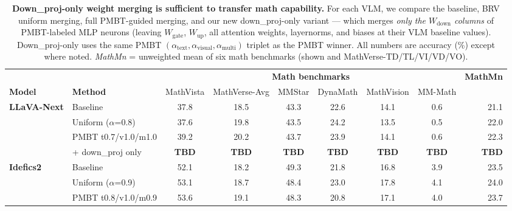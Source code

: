 \begin{table}[t]
\centering
\small
\caption{\textbf{Down\_proj-only weight merging is sufficient to transfer math capability.}
For each VLM, we compare the baseline, BRV uniform merging, full PMBT-guided merging,
and our new down\_proj-only variant — which merges \emph{only the $W_{\text{down}}$
columns} of PMBT-labeled MLP neurons (leaving $W_{\text{gate}}$, $W_{\text{up}}$, all
attention weights, layernorms, and biases at their VLM baseline values). Down\_proj-only
uses the same PMBT $(\alpha_{\text{text}}, \alpha_{\text{visual}}, \alpha_{\text{multi}})$
triplet as the PMBT winner. All numbers are accuracy (\%) except where noted.
\emph{MathMn} = unweighted mean of six math benchmarks (shown and MathVerse-TD/TL/VI/VD/VO).}
\label{tab:downproj-main}
\begin{tabular}{llcccccc r}
\toprule
                 &                             & \multicolumn{6}{c}{\textbf{Math benchmarks}}                                          & \textbf{MathMn} \\
                                                                                         \cmidrule(lr){3-8}
\textbf{Model}   & \textbf{Method}             & MathVista   & MathVerse-Avg & MMStar     & DynaMath   & MathVision & MM-Math &       \\
\midrule
\multirow{4}{*}{\textbf{LLaVA-Next}}
                 & Baseline                    & 37.8        & 18.5          & 43.3       & 22.6       & 14.1       & 0.6     & 21.1  \\
                 & Uniform ($\alpha$=0.8)      & 37.6        & 19.8          & 43.5       & 24.2       & 13.5       & 0.5     & 22.0  \\
                 & PMBT t0.7/v1.0/m1.0         & 39.2        & 20.2          & 43.7       & 23.9       & 14.1       & 0.6     & 22.3  \\
                 & \quad+ down\_proj only      & \textbf{TBD} & \textbf{TBD}  & \textbf{TBD} & \textbf{TBD} & \textbf{TBD} & \textbf{TBD} & \textbf{TBD}  \\
\midrule
\multirow{4}{*}{\textbf{Idefics2}}
                 & Baseline                    & 52.1        & 18.2          & 49.3       & 21.8       & 16.8       & 3.9     & 23.5  \\
                 & Uniform ($\alpha$=0.9)      & 53.1        & 18.7          & 48.4       & 23.0       & 17.8       & 4.1     & 24.0  \\
                 & PMBT t0.8/v1.0/m0.9         & 53.6        & 19.1          & 48.3       & 20.8       & 17.1       & 4.0     & 23.7  \\

\end{tabular}
\end{table}

